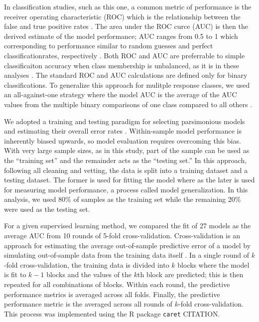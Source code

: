 \documentclass[12pt,letterpaper]{article}
\begin{document}
In classification studies, such as this one, a common metric of performance is the receiver operating characteristic (ROC) which is the relationship between the false and true positive rates \citep{Hastie2009}. The area under the ROC curce (AUC) is then the derived estimate of the model performance; AUC ranges from 0.5 to 1 which corresponding to performance similar to random guesses and perfect classificationrates, respectively \citep{Hastie2009}. Both ROC and AUC are preferrable to simple classificaiton accuracy when class membership is unbalanced, as it is in these analyses \citep{Hastie2009}. The standard ROC and AUC calculations are defined only for binary classifications. To generalize this approach for mulitple response classes, we used an all-against-one strategy where the model AUC is the average of the AUC values from the multiple binary comparisons of one class compared to all others \citep{Hand2001}. 


We adopted a training and testing paradigm for selecting parsimonious models and estimating their overall error rates \citep{Hastie2009,Kuhn2013}. Within-sample model performance is inherently biased upwards, so model evaluation requires overcoming this bias. With very large sample sizes, as in this study, part of the sample can be used as the ``training set'' and the remainder acts as the ``testing set.'' In this approach, following all cleaning and vetting, the data is split into a training dataset and a testing dataset. The former is used for fitting the model where as the later is used for measuring model performance, a process called model generalization. In this analysis, we used 80\% of samples as the training set while the remaining 20\% were used as the testing set. 

For a given supervised learning method, we compared the fit of 27 models as the average AUC from 10 rounds of 5-fold cross-validation. Cross-validation is an approach for estimating the average out-of-sample predictive error of a model by simulating out-of-sample data from the training data itself \citep{Hastie2009}. In a single round of \(k\)-fold cross-validation, the training data is divided into \(k\) blocks where the model is fit to \(k - 1\) blocks and the values of the \(k\)th block are predicted; this is then repeated for all combinations of blocks. Within each round, the predictive performance metrics is averaged across all folds. Finally, the predictive performance metric is the averaged across all rounds of \(k\)-fold cross-validation. This process was implemented using the R package \texttt{caret} CITATION.
\end{document}
